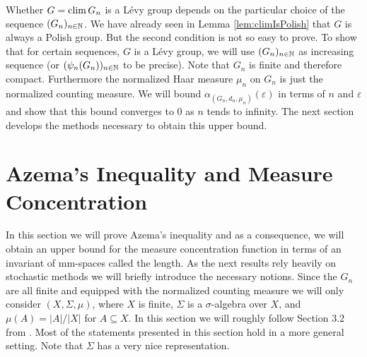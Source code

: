 Whether $G=\operatorname{clim} G_n$ is a L\'evy group depends on the particular choice of the sequence $(G_n)_{n\in\mathbb{N}}$. We have already seen in Lemma \ref{lem:climIsPolish} that $G$ is always a Polish group. But the second condition is not so easy to prove.
To show that for certain sequences, $G$ is a L\'evy group, we will use $(G_n)_{n\in\mathbb{N}}$ as increasing sequence (or $(\psi_n(G_n))_{n\in\mathbb{N}}$ to be precise). Note that $G_n$ is finite and therefore compact. Furthermore the normalized Haar measure $\mu_n$ on $G_n$ is just the normalized counting measure. We will bound $\alpha_{(G_n,d_n,\mu_n)}(\varepsilon)$ in terms of $n$ and $\varepsilon$ and show that this bound converges to 0 as $n$ tends to infinity. 
The next section develops the methods necessary to obtain this upper bound.


\section{Azema's Inequality and Measure Concentration}\label{sec:azema}
In this section we will prove Azema's inequality and as a consequence, we will obtain an upper bound for the measure concentration function in terms of an invariant of mm-spaces called the length. As the next results rely heavily on stochastic methods we will briefly introduce the necessary notions. Since the $G_n$ are all finite and equipped with the normalized counting measure we will only consider  $(X,\Sigma,\mu)$, where $X$ is finite, $\Sigma$ is a $\sigma$-algebra over $X$, and $\mu(A)=|A|/|X|$ for $A\subseteq X$. In this section we will roughly follow Section 3.2 from \cite{Azema}. Most of the statements presented in this section hold in a more general setting. Note that $\Sigma$ has a very nice representation.%

